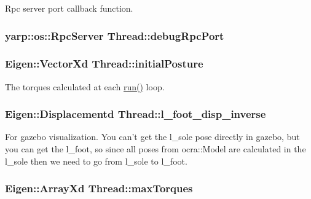 \-Rpc server port callback function. \hypertarget{classThread_aa6b8f3712e7776d560b0a535eff73c34}{
\subsubsection[{debug\-Rpc\-Port}]{\setlength{\rightskip}{0pt plus 5cm}yarp\-::os\-::\-Rpc\-Server {\bf \-Thread\-::debug\-Rpc\-Port}}}\label{classThread_aa6b8f3712e7776d560b0a535eff73c34}
\hypertarget{classThread_aa59863bb50c8aa88fe5872e75be44cb7}{
\subsubsection[{initial\-Posture}]{\setlength{\rightskip}{0pt plus 5cm}\-Eigen\-::\-Vector\-Xd {\bf \-Thread\-::initial\-Posture}}}\label{classThread_aa59863bb50c8aa88fe5872e75be44cb7}
\-The torques calculated at each \hyperlink{classThread_ad9373d8d725c46717dfce3130018fe3a}{run()} loop. \hypertarget{classThread_a304e7ee40ec0ceec2fc7ca80353ab478}{
\subsubsection[{l\-\_\-foot\-\_\-disp\-\_\-inverse}]{\setlength{\rightskip}{0pt plus 5cm}\-Eigen\-::\-Displacementd {\bf \-Thread\-::l\-\_\-foot\-\_\-disp\-\_\-inverse}}}\label{classThread_a304e7ee40ec0ceec2fc7ca80353ab478}
\-For gazebo visualization. \-You can't get the l\-\_\-sole pose directly in gazebo, but you can get the l\-\_\-foot, so since all poses from ocra\-::\-Model are calculated in the l\-\_\-sole then we need to go from l\-\_\-sole to l\-\_\-foot. \hypertarget{classThread_af28a4fcbbcbf77c42237c0be75a25a54}{
\subsubsection[{max\-Torques}]{\setlength{\rightskip}{0pt plus 5cm}\-Eigen\-::\-Array\-Xd {\bf \-Thread\-::max\-Torques}}}\label{classThread_af28a4fcbbcbf77c42237c0be75a25a54}
